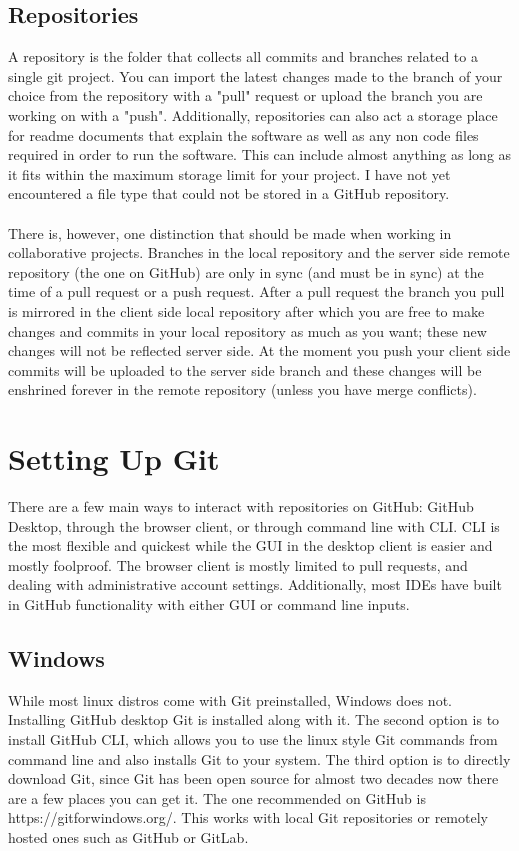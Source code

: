 \documentclass{article}
\begin{document}
\subsection{Repositories}
A repository is the folder that collects all commits and branches related to a single git project. You can import the latest changes made to the branch of your choice from the repository with a "pull" request or upload the branch you are working on with a "push". Additionally, repositories can also act a storage place for readme documents that explain the software as well as any non code files required in order to run the software. This can include almost anything as long as it fits within the maximum storage limit for your project. I have not yet encountered a file type that could not be stored in a GitHub repository.
\paragraph{}
There is, however, one distinction that should be made when working in collaborative projects. Branches in the local repository and the server side remote repository (the one on GitHub) are only in sync (and must be in sync) at the time of a pull request or a push request. After a pull request the branch you pull is mirrored in the client side local repository after which you are free to make changes and commits in your local repository as much as you want; these new changes will not be reflected server side. At the moment you push your client side commits will be uploaded to the server side branch and these changes will be enshrined forever in the remote repository (unless you have merge conflicts).
\section{Setting Up Git}
There are a few main ways to interact with repositories on GitHub: GitHub Desktop, through the browser client, or through command line with CLI. CLI is the most flexible and quickest while the GUI in the desktop client is easier and mostly foolproof. The browser client is mostly limited to pull requests, and dealing with administrative account settings. Additionally, most IDEs have built in GitHub functionality with either GUI or command line inputs. 
\subsection{Windows}
While most linux distros come with Git preinstalled, Windows does not. Installing GitHub desktop Git is installed along with it. The second option is to install GitHub CLI, which allows you to use the linux style Git commands from command line and also installs Git to your system. The third option is to directly download Git, since Git has been open source for almost two decades now there are a few places you can get it. The one recommended on GitHub is https://gitforwindows.org/. This works with local Git repositories or remotely hosted ones such as GitHub or GitLab.
\end{document}
